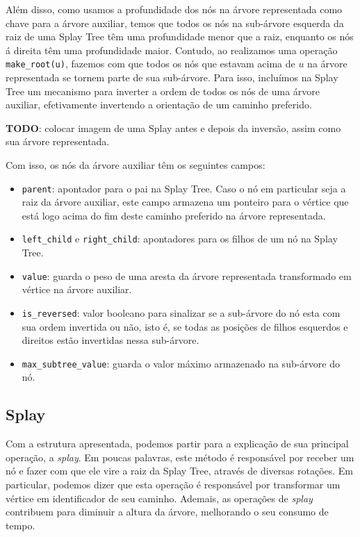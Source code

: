 Além disso, como usamos a profundidade dos nós na árvore representada como chave para a árvore auxiliar, temos que todos os nós na sub-árvore esquerda da raiz de uma Splay Tree têm uma profundidade menor que a raiz, enquanto os nós á direita têm uma profundidade maior. Contudo, ao realizamos uma operação \texttt{make\_root(u)}, fazemos com que todos os nós que estavam acima de $u$ na árvore representada se tornem parte de sua sub-árvore. Para isso, incluímos na Splay Tree um mecanismo para inverter a ordem de todos os nós de uma árvore auxiliar, efetivamente invertendo a orientação de um caminho preferido.

\begin{center}
    \textbf{TODO}: colocar imagem de uma Splay antes e depois da inversão, assim como sua árvore representada.
\end{center}

Com isso, os nós da árvore auxiliar têm os seguintes campos:

\begin{itemize}
    \item \texttt{parent}: apontador para o pai na Splay Tree. Caso o nó em particular seja a raiz da árvore auxiliar, este campo armazena um ponteiro para o vértice que está logo acima do fim deste caminho preferido na árvore representada.
    \item \texttt{left\_child} e \texttt{right\_child}: apontadores para os filhos de um nó na Splay Tree.
    \item \texttt{value}: guarda o peso de uma aresta da árvore representada transformado em vértice na árvore auxiliar.
    \item \texttt{is\_reversed}: valor booleano para sinalizar se a sub-árvore do nó esta com sua ordem invertida ou não, isto é, se todas as posições de filhos esquerdos e direitos estão  invertidas nessa  sub-árvore.
    \item \texttt{max\_subtree\_value}: guarda o valor máximo armazenado na sub-árvore do nó.
\end{itemize}

\subsection{Splay}
\label{subsection:lct-splay-splay}

Com a estrutura apresentada, podemos partir para a explicação de sua principal operação, a \emph{splay}. Em poucas palavras, este método é responsável por receber um nó e fazer com que ele vire a raiz da Splay Tree, através de diversas rotações. Em particular, podemos dizer que esta operação é responsável por transformar um vértice em identificador de seu caminho. Ademais, as operações de \emph{splay} contribuem para diminuir a altura da árvore, melhorando o seu consumo de tempo.

